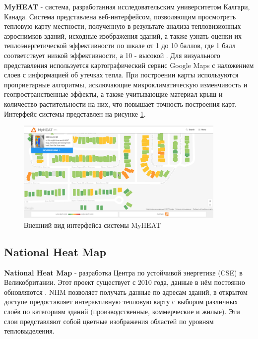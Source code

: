 \par
	\textbf{MyHEAT} - система, разработанная исследовательским университетом Калгари, Канада. Система представлена веб-интерфейсом, позволяющим просмотреть тепловую карту местности, полученную в результате анализа тепловизионных аэроснимков зданий, исходные изображения зданий, а также узнать оценки их теплоэнергетической эффективности по шкале от 1 до 10 баллов, где 1 балл соответствует низкой эффективности, а 10 - высокой \cite{problem:myheat-utilities}. Для визуального представления используется картографический сервис {Google Maps} с наложением слоев с информацией об утечках тепла. При построении карты используются проприетарные алгоритмы, исключающие микроклиматическую изменчивость и геопространственные эффекты, а также учитывающие материал крыш и количество растительности на них, что повышает точность построения карт. Интерфейс системы представлен на рисунке \ref{screens:myheat}.

	\begin{figure}[h!]
      \centering
      \includegraphics[width=0.9\textwidth]{images/screens/0_myheat.png}
      \caption{Внешний вид интерфейса системы MyHEAT}
      \label{screens:myheat}
    \end{figure}

\subsection{National Heat Map}

\par
	\textbf{National Heat Map} - разработка Центра по устойчивой энергетике (CSE) в Великобритании. Этот проект существует с 2010 года, данные в нём постоянно обновляются \cite{problem:nhm}. NHM позволяет получать данные по адресам зданий, в открытом доступе предоставляет интерактивную тепловую карту с выбором различных слоёв по категориям зданий (производственные, коммерческие и жилые). Эти слои представляют собой цветные изображения областей по уровням тепловыделения.

